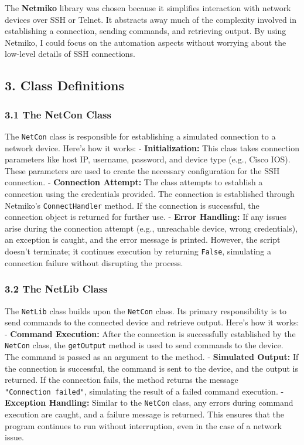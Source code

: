 \documentclass[11pt]{article}
\begin{document}
The \textbf{Netmiko} library was chosen because it simplifies
interaction with network devices over SSH or Telnet. It abstracts away
much of the complexity involved in establishing a connection, sending
commands, and retrieving output. By using Netmiko, I could focus on the
automation aspects without worrying about the low-level details of SSH
connections.

\hypertarget{class-definitions}{%
\subsection{3. Class Definitions}\label{class-definitions}}

\hypertarget{the-netcon-class}{%
\subsubsection{\texorpdfstring{3.1 The \textbf{NetCon}
Class}{3.1 The NetCon Class}}\label{the-netcon-class}}

The \texttt{NetCon} class is responsible for establishing a simulated
connection to a network device. Here's how it works: -
\textbf{Initialization:} This class takes connection parameters like
host IP, username, password, and device type (e.g., Cisco IOS). These
parameters are used to create the necessary configuration for the SSH
connection. - \textbf{Connection Attempt:} The class attempts to
establish a connection using the credentials provided. The connection is
established through Netmiko's \texttt{ConnectHandler} method. If the
connection is successful, the connection object is returned for further
use. - \textbf{Error Handling:} If any issues arise during the
connection attempt (e.g., unreachable device, wrong credentials), an
exception is caught, and the error message is printed. However, the
script doesn't terminate; it continues execution by returning
\texttt{False}, simulating a connection failure without disrupting the
process.

\hypertarget{the-netlib-class}{%
\subsubsection{\texorpdfstring{3.2 The \textbf{NetLib}
Class}{3.2 The NetLib Class}}\label{the-netlib-class}}

The \texttt{NetLib} class builds upon the \texttt{NetCon} class. Its
primary responsibility is to send commands to the connected device and
retrieve output. Here's how it works: - \textbf{Command Execution:}
After the connection is successfully established by the \texttt{NetCon}
class, the \texttt{getOutput} method is used to send commands to the
device. The command is passed as an argument to the method. -
\textbf{Simulated Output:} If the connection is successful, the command
is sent to the device, and the output is returned. If the connection
fails, the method returns the message \texttt{"Connection\ failed"},
simulating the result of a failed command execution. - \textbf{Exception
Handling:} Similar to the \texttt{NetCon} class, any errors during
command execution are caught, and a failure message is returned. This
ensures that the program continues to run without interruption, even in
the case of a network issue.
\end{document}
